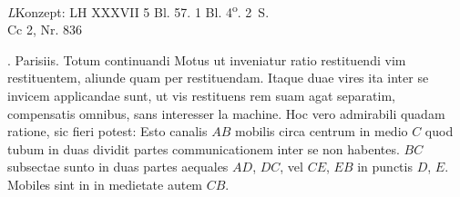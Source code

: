 \begin{Ueberlieferung}%
{\textit{L}}Konzept:
 LH XXXVII 5 Bl. 57.
1 Bl. 4\textsuperscript{o}. 2~S.\\%
Cc 2, Nr. 836
\end{Ueberlieferung}
%
%
\count{}
\count{}
\count{}
\vspace{8mm}
\pstart%
. Parisiis.%
\newline%
Totum continuandi Motus  ut inveniatur ratio restituendi vim restituentem\protect{}, aliunde quam per restituendam. Itaque duae vires ita inter se invicem applicandae sunt, ut vis restituens rem suam agat separatim, compensatis omnibus, sans interesser  
la machine. Hoc vero admirabili quadam  ratione, sic fieri potest:
\pend 
\pstart
\indent Esto canalis $AB$ mobilis circa centrum in medio $C$ quod tubum in duas dividit partes communicationem inter se non habentes.  $BC$ subsectae sunto in duas  partes aequales $AD$, $DC$, vel $CE$, $EB$ in punctis $D$, $E$. Mobiles sint in  
\protect{} in medietate  autem  $CB$.%
